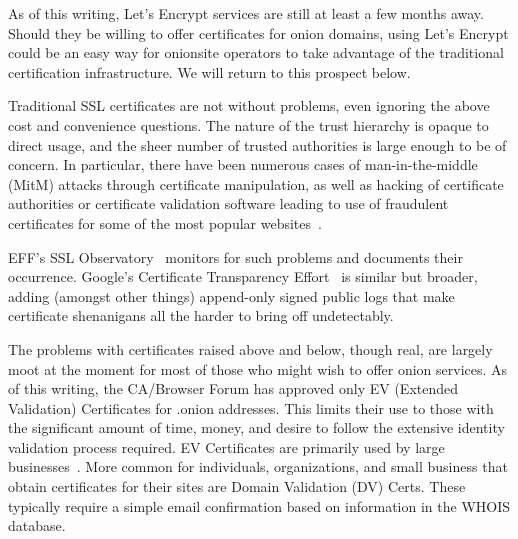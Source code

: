 \documentclass[10pt, conference, compsocconf]{styles/IEEEtran}
\begin{document}
As of this writing, Let's Encrypt services are still at least a few months away.
Should they be willing to offer certificates for onion
domains, using Let's Encrypt could be an easy way for
onionsite operators to take advantage of the traditional certification
infrastructure. We will return to this prospect below.

Traditional SSL certificates are not without problems, even ignoring
the above cost and convenience questions. The nature of the trust
hierarchy is opaque to direct usage, and the sheer number of trusted
authorities is large enough to be of concern. In particular, there
have been numerous cases of man-in-the-middle (MitM) attacks through
certificate manipulation, as well as hacking of certificate
authorities or certificate validation software leading to use of
fraudulent certificates for some of the most popular
websites~\cite{forged-ssl-oakland14}.


EFF's SSL Observatory~\cite{ssl-observatory} 
monitors for such problems and documents their occurrence.
Google's Certificate Transparency
Effort~\cite{certificate-transparency} is similar but broader,
adding (amongst other things) append-only signed public
logs that make certificate shenanigans all the harder to bring off
undetectably.


The problems with certificates raised above and below, though real,
are largely moot at the moment for most of those who might wish
to offer onion services. As of this writing,
the CA/Browser Forum has approved only EV (Extended Validation)
Certificates for .onion addresses. This limits their use to those with
the significant amount of time, money, and desire to follow the
extensive identity validation process required.  EV Certificates are
primarily used by large businesses~\cite{wikipedia-ev}. More common
for individuals, organizations, and small business that obtain
certificates for their sites are Domain Validation (DV) Certs. These
typically require a simple email confirmation based on information in
the WHOIS database.  
\end{document}
